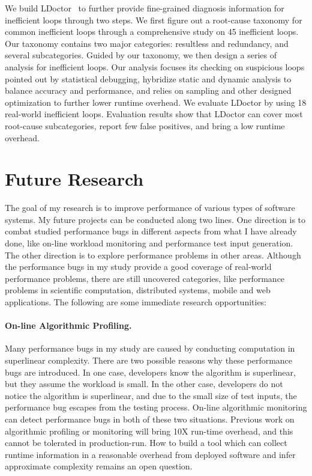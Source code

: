 \documentclass[10pt]{article}
\begin{document}
We build LDoctor~\cite{Song16PLDI} to further provide fine-grained diagnosis information for inefficient loops through two steps. 
We first figure out a root-cause taxonomy for common inefficient loops through a comprehensive study on 45 inefficient loops. 
Our taxonomy contains two major categories: resultless and redundancy, and several subcategories. 
Guided by our taxonomy, we then design a series of analysis for inefficient loops. 
Our analysis 
focuses its checking on suspicious loops pointed out by statistical debugging, 
hybridize static and dynamic analysis to balance accuracy and performance, 
and relies on sampling and other designed optimization to further lower runtime overhead. 
We evaluate LDoctor by using 18 real-world inefficient loops. 
Evaluation results show that LDoctor can cover most root-cause subcategories, 
report few false positives, and bring a low runtime overhead. 


\section{Future Research}

The goal of my research is to improve performance of various types of software systems. 
My future projects can be conducted along two lines. 
One direction is to combat studied performance bugs in different aspects from what I have already done, 
like on-line workload monitoring and performance test input generation. 
The other direction is to explore performance problems in other areas. 
Although the performance bugs in my study provide a good coverage of real-world performance problems, 
there are still uncovered categories, 
like performance problems in scientific computation, distributed systems, mobile and web applications. 
The following are some immediate research opportunities: 

\paragraph{On-line Algorithmic Profiling.}
Many performance bugs in my study are caused by conducting computation in superlinear complexity. 
There are two possible reasons why these performance bugs are introduced. 
In one case, developers know the algorithm is superlinear, but they assume the workload is small. 
In the other case, developers do not notice the algorithm is superlinear, 
and due to the small size of test inputs, 
the performance bug escapes from the testing process. 
On-line algorithmic monitoring can detect performance bugs in both of these two situations. 
Previous work on algorithmic profiling or monitoring will bring 10X run-time overhead, 
and this cannot be tolerated in production-run. 
How to build a tool which can collect runtime information in a reasonable overhead from deployed software 
and infer approximate complexity remains an open question. 
\end{document}
